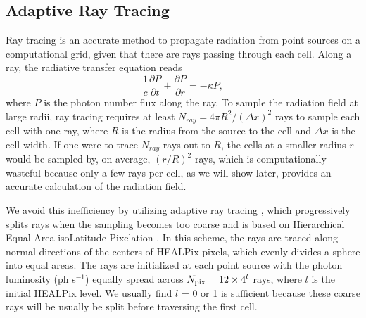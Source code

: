 \documentclass[apj,onecolumn]{emulateapj}
\begin{document}


\subsection{Adaptive Ray Tracing}
\label{sec:ART}

Ray tracing is an accurate method to propagate radiation from point
sources on a computational grid, given that there are rays passing
through each cell.  Along a ray, the radiative transfer equation reads
%
\begin{equation}
\label{eqn:rtray}
\frac{1}{c} \frac{\partial P}{\partial t} + \frac{\partial P}{\partial
  r} = -\kappa P,
\end{equation}
%
where $P$ is the photon number flux along the ray.  To sample the
radiation field at large radii, ray tracing requires at least $N_{ray}
= 4\pi R^2 / (\Delta x)^2$ rays to sample each cell with one ray,
where $R$ is the radius from the source to the cell and $\Delta x$ is
the cell width.  If one were to trace $N_{ray}$ rays out to $R$, the
cells at a smaller radius $r$ would be sampled by, on average,
$(r/R)^2$ rays, which is computationally wasteful because only a few
rays per cell, as we will show later, provides an accurate calculation
of the radiation field.

We avoid this inefficiency by utilizing adaptive ray tracing
\citep{Abel02_RT}, which progressively splits rays when the sampling
becomes too coarse and is based on Hierarchical Equal Area isoLatitude
Pixelation \citep[HEALPix;][]{HEALPix}.  In this scheme, the rays are
traced along normal directions of the centers of HEALPix pixels, which
evenly divides a sphere into equal areas.  The rays are initialized at
each point source with the photon luminosity (ph s$^{-1}$) equally
spread across $N_{\rm pix} = 12 \times 4^l$ rays, where $l$ is the
initial HEALPix level.  We usually find $l$ = 0 or 1 is sufficient
because these coarse rays will be usually be split before traversing
the first cell.
\end{document}
